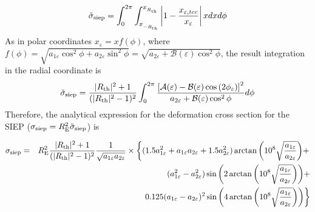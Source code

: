 \begin{equation}
\tilde{\sigma}_{\rm siep}= \int_{0}^{2\pi}\int_{x_{_{-R_{\rm th}}}}^{x_{_{R_{\rm th}}}}\left| 1-\dfrac{x_{\varepsilon,tcc}}{x_{\varepsilon}}\right| x dx d\phi 
\end{equation}
As in polar coordinates $x_{\varepsilon}=xf(\phi)$, where $f(\phi)=\sqrt{a_{1\varepsilon}\cos^2{\phi}+a_{2\varepsilon}\sin^2{\phi}}=\sqrt{a_{2\varepsilon}+\mathcal{B}(\varepsilon)\cos^2{\phi}}$, the result integration in the radial coordinate is
\begin{equation}
\tilde{\sigma}_{\rm siep}= \dfrac{|R_{\rm th}|^2+1}{(|R_{\rm th}|^2-1)^2}
\int_{0}^{2\pi}\dfrac{\left[\mathcal{A}(\varepsilon)-\mathcal{B}(\varepsilon)\cos{
(2\phi_\varepsilon)} \right]^2}{a_{2\varepsilon}+\mathcal{B}(\varepsilon)\cos^2{\phi}} d\phi 
\end{equation}
Therefore, the analytical expression for the deformation cross section for the SIEP ($\sigma_{\rm siep}=R^2_{\rm E}\tilde{\sigma}_{\rm siep}$) is

\begin{eqnarray}
\sigma_{\rm siep}&=& R^2_{\rm E}\dfrac{|R_{\rm th}|^2+1}{(|R_{\rm th}|^2-1)^2}\dfrac{1}{\sqrt{a_{1\varepsilon} a_{2\varepsilon}}}\times \left\{(1.5a^2_{1\varepsilon}+a_{1\varepsilon}a_{2\varepsilon}+1.5 a^2_{2\varepsilon})\arctan{\left(10^{8}\sqrt{\frac{a_{1\varepsilon}}{a_{2\varepsilon}}} \right)} + \right. \nonumber \\
& & (a^2_{1\varepsilon}-a^ 2_{2\varepsilon})\sin{\left(2\arctan{\left( 10^{8}\sqrt{\frac{a_{1\varepsilon}}{a_{2\varepsilon}}}\right)}\right)} + \\
 & & \left. 0.125(a_{1\varepsilon}-a_{2\varepsilon})^2\sin{\left(4\arctan{\left(10^{8}\sqrt{\frac{a_{1\varepsilon}}{a_{2\varepsilon}}} \right)}\right)}\right\}  \nonumber 
\end{eqnarray}




